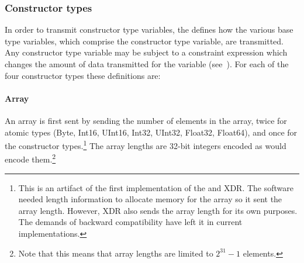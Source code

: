 \documentclass[justify]{nasa-ese}
\begin{document}
\subsubsection{Constructor types}

In order to transmit constructor type variables, the \DAP defines how the
various base type variables, which comprise the constructor type variable,
are transmitted. Any constructor type variable may be subject to a constraint
expression which changes the amount of data transmitted for the variable
(see~). For each of the four constructor types these
definitions are:

\paragraph{Array}
\label{par:array}

An array is first sent by sending the number of elements in the array,
twice for atomic types (Byte, Int16, UInt16, Int32, UInt32, Float32,
Float64), and once for the constructor types.\footnote{This is an
  artifact of the first implementation of the \DAP and XDR. The \DAP
  software needed length information to allocate memory for the array
  so it sent the array length. However, XDR also sends the array
  length for its own purposes. The demands of backward compatibility
  have left it in current implementations.} The array lengths are
32-bit integers encoded as  would encode
them.\footnote{Note that this means that array lengths are limited to
  $2^{31}-1$ elements.}
\end{document}
